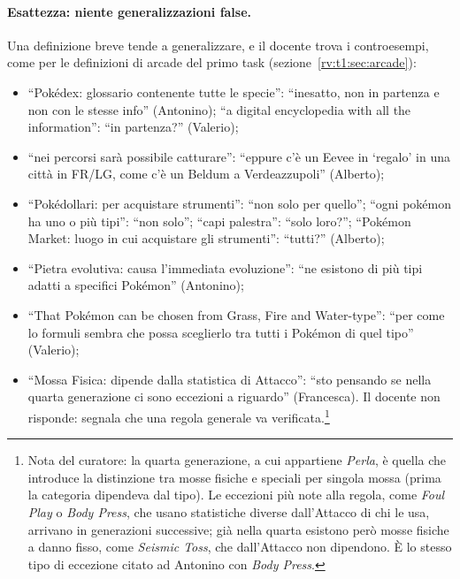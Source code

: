 \paragraph{Esattezza: niente generalizzazioni false.} Una definizione breve
tende a generalizzare, e il docente trova i controesempi, come per le
definizioni di arcade del primo task (sezione~\ref{rv:t1:sec:arcade}):
\begin{itemize}
  \item ``Pokédex: glossario contenente tutte le specie'': ``inesatto, non in
        partenza e non con le stesse info'' (Antonino); ``a digital
        encyclopedia with all the information'': ``in partenza?'' (Valerio);
  \item ``nei percorsi sarà possibile catturare'': ``eppure c'è un Eevee in
        `regalo' in una città in FR/LG, come c'è un Beldum a Verdeazzupoli''
        (Alberto);
  \item ``Pokédollari: per acquistare strumenti'': ``non solo per quello'';
        ``ogni pokémon ha uno o più tipi'': ``non solo''; ``capi palestra'':
        ``solo loro?''; ``Pokémon Market: luogo in cui acquistare gli
        strumenti'': ``tutti?'' (Alberto);
  \item ``Pietra evolutiva: causa l'immediata evoluzione'': ``ne esistono di
        più tipi adatti a specifici Pokémon'' (Antonino);
  \item ``That Pokémon can be chosen from Grass, Fire and Water-type'': ``per
        come lo formuli sembra che possa sceglierlo tra tutti i Pokémon di
        quel tipo'' (Valerio);
  \item ``Mossa Fisica: dipende dalla statistica di Attacco'': ``sto pensando
        se nella quarta generazione ci sono eccezioni a riguardo''
        (Francesca). Il docente non risponde: segnala che una regola generale
        va verificata.\footnote{Nota del curatore: la quarta generazione, a cui
        appartiene \emph{Perla}, è quella che introduce la distinzione tra
        mosse fisiche e speciali per singola mossa (prima la categoria
        dipendeva dal tipo). Le eccezioni più note alla regola, come
        \emph{Foul Play} o \emph{Body Press}, che usano statistiche diverse
        dall'Attacco di chi le usa, arrivano in generazioni successive; già
        nella quarta esistono però mosse fisiche a danno fisso, come
        \emph{Seismic Toss}, che dall'Attacco non dipendono. È lo stesso
        tipo di eccezione citato ad Antonino con \emph{Body Press}.}
\end{itemize}

